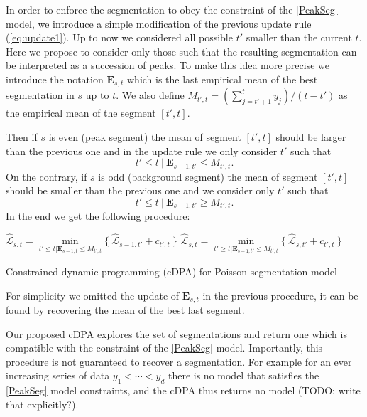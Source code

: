 \documentclass{article}
\begin{document}
 In order to enforce the segmentation to obey the constraint of the
 \ref{PeakSeg} model, we introduce a simple modification of the
 previous update rule (\ref{eq:update1}). %
 Up to now we considered all possible $t'$ smaller than the current
 $t$. Here we propose to consider only those such that the resulting
 segmentation can be interpreted as a succession of peaks. To make
 this idea more precise we introduce the notation $\mathbf{E}_{s,t}$
 which is the last empirical mean of the best segmentation in $s$ up
 to $t$.  We also define $M_{t', t} = (\sum_{j=t'+1}^t y_j)/(t-t')$ as
 the empirical mean of the segment $[t', t]$.

Then if $s$ is even (peak segment) the mean of segment $[t', t]$
should be larger than the previous one and in the update rule we only
consider $t'$ such that
$$ t' \leq t \ | \ \mathbf{E}_{s-1,t'} \leq M_{t', t}.$$
On the contrary, if $s$ is odd (background segment) the mean of
segment $[t', t]$ should be smaller than the previous one and we
consider only $t'$ such that
$$ t' \leq t \ | \ \mathbf{E}_{s-1,t'} \geq M_{t', t}.$$
In the end we get the following procedure:
\begin{algorithm}[H]
\begin{algorithmic}[1]
\STATE $ \widehat{\mathcal{L}}_{s,t} = \underset{t' \leq t| \mathbf{E}_{s-1,t} \leq M_{t', t}} {\min}\{ \ \widehat{\mathcal{L}}_{s-1,t'} + c_{t', t} \ \}$
\ENDIF
{}
\STATE $ \widehat{\mathcal{L}}_{s,t} = \underset{t' \geq t | \mathbf{E}_{s-1,t'} \leq M_{t', t} }{\min} \{ \ \widehat{\mathcal{L}}_{s,t'} + c_{t',t} \ \}$
\ENDIF
\ENDFOR
\ENDFOR
\caption{Constrained dynamic programming (cDPA) for Poisson
  segmentation model}
\end{algorithmic}\label{algo:v2}
\end{algorithm}

For simplicity we omitted the update of $\mathbf{E}_{s,t}$ in the
previous procedure, it can be found by recovering the mean of the best
last segment.

Our proposed cDPA explores the set of segmentations and return one
which is compatible with the constraint of the \ref{PeakSeg}
model. Importantly, this procedure is not guaranteed to recover a
segmentation. For example for an ever increasing series of data $y_1 <
\cdots < y_d$ there is no model that satisfies the \ref{PeakSeg} model
constraints, and the cDPA thus returns no model (TODO: write that
explicitly?).
\end{document}
